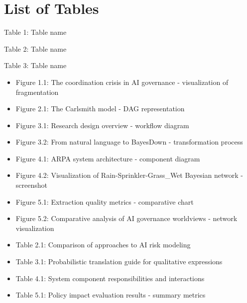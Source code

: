 \documentclass[12pt,a4paper]{report}
\providecommand{\tightlist}{%
  \setlength{\itemsep}{0pt}\setlength{\parskip}{0pt}}
\begin{document}

\section*{List of Tables}\label{list-of-tables}


Table 1: Table name

Table 2: Table name

Table 3: Table name

\begin{itemize}
\tightlist
\item
  Figure 1.1: The coordination crisis in AI governance - visualization
  of fragmentation\\
\item
  Figure 2.1: The Carlsmith model - DAG representation\\
\item
  Figure 3.1: Research design overview - workflow diagram\\
\item
  Figure 3.2: From natural language to BayesDown - transformation
  process\\
\item
  Figure 4.1: ARPA system architecture - component diagram\\
\item
  Figure 4.2: Visualization of Rain-Sprinkler-Grass\_Wet Bayesian
  network - screenshot\\
\item
  Figure 5.1: Extraction quality metrics - comparative chart\\
\item
  Figure 5.2: Comparative analysis of AI governance worldviews - network
  visualization\\
\item
  Table 2.1: Comparison of approaches to AI risk modeling\\
\item
  Table 3.1: Probabilistic translation guide for qualitative
  expressions\\
\item
  Table 4.1: System component responsibilities and interactions\\
\item
  Table 5.1: Policy impact evaluation results - summary metrics
\end{itemize}
\end{document}
